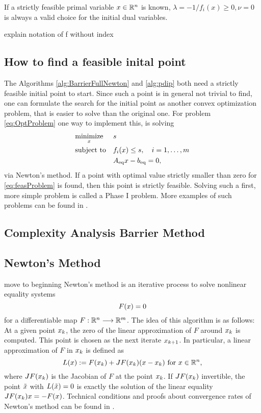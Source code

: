 \begin{remark}
	If a strictly feasible primal variable $ x \in \mathbb{R}^n $ is known, $ \lambda= -1/f_i(x) \geq 0, \nu=0 $ is always a valid choice for the initial dual variables.
\end{remark}

\todo explain notation of f without index
\subsection{How to find a feasible inital point}
The Algorithms \ref{alg:BarrierFullNewton} and \ref{alg:pdip} both need a strictly feasible initial point to start. Since such a point is in general not trivial to find, one can formulate the search for the initial point as another convex optimization problem, that is easier to solve than the original one.  
For problem \eqref{eq:OptProblem} one way to implement this, is solving
\begin{equation}
	\begin{aligned} & \underset{x}{\text{minimize}} & & s\\ & \text{subject to} & & f_i(x) \leq s, \quad i=1,\dots,m\\ & & &{A}_{\mathrm{eq}} x - {b}_{\mathrm{eq}} = 0, \; \end{aligned}
	\label{eq:feasProblem}
\end{equation}
via Newton's method. If a point with optimal value strictly smaller than zero for \eqref{eq:feasProblem} is found, then this point is strictly feasible. Solving such a first, more simple problem is called a Phase I problem. More examples of such problems can be found in \cite{BV}.


\subsection{Complexity Analysis Barrier Method}

\todo
\subsection{Newton's Method}
\todo move to beginning
Newton's method is an iterative process to solve nonlinear equality systems
\begin{equation}
F(x)= 0
\end{equation}
for a differentiable map $ F: \mathbb{R}^n \longrightarrow \mathbb{R}^m $. The idea of this algorithm is as follows: At a given point $ x_k $, the zero of the linear approximation of $ F $ around $ x_k $  is computed. This point is chosen as the next iterate $ x_{k+1} $. In particular, a linear approximation of $ F $ in  $ x_k $ is defined as
\begin{equation}
	L(x):= F(x_k) + J F (x_k)(x - x_k) \text{ for } x\in \mathbb{R}^n,
\end{equation}
where $ J F (x_k) $ is the Jacobian of $ F $ at the point $ x_k $. If $ J F (x_k) $ invertible, the point $ \tilde{x} $ with $ L(\tilde{x})=0 $ is exactly the solution of  the linear equality $ J F (x_k) x = -F(x) $.
Technical conditions and proofs about convergence rates of Newton's method can be found in \cite{SO}.

